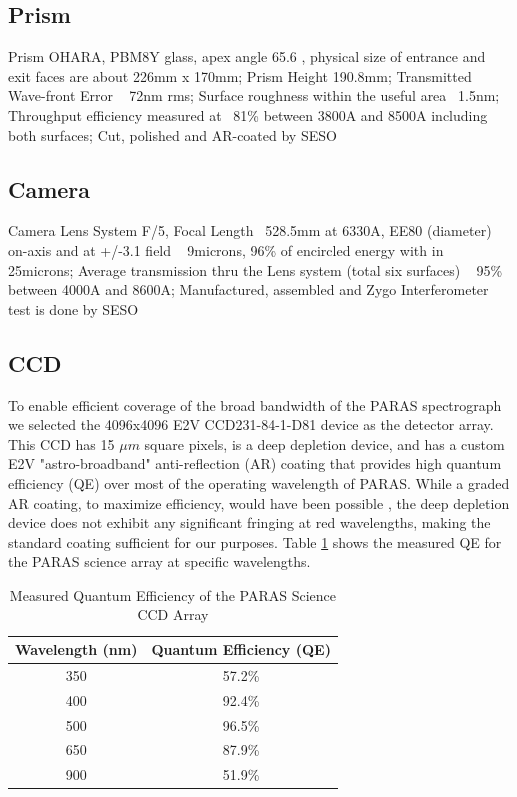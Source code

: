 \documentclass[12pt,preprint]{emulateapj}
\begin{document}
\subsection{Prism}
Prism   OHARA, PBM8Y glass, apex angle 65.6 , physical size of entrance and exit faces are about 226mm x 170mm; Prism Height 190.8mm; Transmitted Wave-front Error ~ 72nm rms; Surface roughness within the useful area ~1.5nm; Throughput efficiency measured at ~81\% between 3800A and 8500A including both surfaces; Cut, polished and AR-coated by SESO
\subsection{Camera}
Camera Lens System  F/5, Focal Length ~528.5mm at 6330A, EE80 (diameter) on-axis and at +/-3.1  field ~ 9microns, 96\% of encircled energy with in 25microns; Average transmission thru the Lens system (total six surfaces) ~ 95\% between 4000A and 8600A; Manufactured, assembled and Zygo Interferometer test is done by SESO
\subsection{CCD}
To enable efficient coverage of the broad bandwidth of the PARAS spectrograph we selected the 4096x4096 E2V CCD231-84-1-D81 device as the detector array. This CCD has 15 $\mu m$ square pixels, is a deep depletion device, and has a custom E2V "astro-broadband" anti-reflection (AR) coating that provides high quantum efficiency (QE) over most of the operating wavelength of PARAS.  While a graded AR coating, to maximize efficiency, would have been possible \citep{Kelt06, Raskin11}, the deep depletion device does not exhibit any significant fringing at red wavelengths, making the standard coating sufficient for our purposes. Table \ref{table:QE} shows the measured QE for the PARAS science array at specific wavelengths.

\begin{table}[h]
\begin{center}
\label{table:QE}
\caption{Measured Quantum Efficiency of the PARAS Science CCD Array}
\begin{tabular}{ c | c }
 \hline
  Wavelength (nm) & Quantum Efficiency (QE)  \\
  \hline
  350 & 57.2\%  \\
  400 & 92.4\%  \\
  500 & 96.5\%  \\
  650 & 87.9\%  \\   
  900 & 51.9\%  \\     
  \hline  
\end{tabular}
\end{center}
\end{table}
\end{document}

